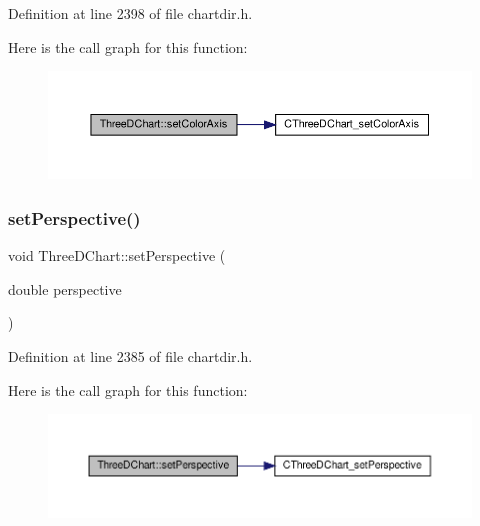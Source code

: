 Definition at line 2398 of file chartdir.\+h.

Here is the call graph for this function\+:
\nopagebreak
\begin{figure}[H]
\begin{center}
\leavevmode
\includegraphics[width=350pt]{class_three_d_chart_a23f0c5861b70941b12c96e45d7f3a754_cgraph}
\end{center}
\end{figure}
\mbox{\label{class_three_d_chart_af26e93cca1757657cd419ec7efae330c}} 
\subsubsection{\texorpdfstring{set\+Perspective()}{setPerspective()}}
{\footnotesize\ttfamily void Three\+D\+Chart\+::set\+Perspective (\begin{DoxyParamCaption}\item[{double}]{perspective }\end{DoxyParamCaption})\hspace{0.3cm}{\ttfamily [inline]}}



Definition at line 2385 of file chartdir.\+h.

Here is the call graph for this function\+:
\nopagebreak
\begin{figure}[H]
\begin{center}
\leavevmode
\includegraphics[width=350pt]{class_three_d_chart_af26e93cca1757657cd419ec7efae330c_cgraph}
\end{center}
\end{figure}
\mbox{\label{class_three_d_chart_a5c462fd933130bfb21c0d0b09af6f281}} 
